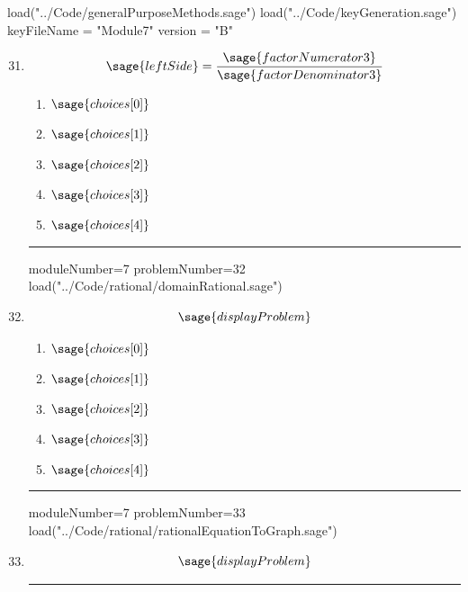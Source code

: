 \documentclass[14pt]{article}
\newcommand{\litem}[1]{\item#1\hspace*{-1cm}\rule{\textwidth}{0.4pt}}
\begin{document}
\pagestyle{fancy}

\begin{sagesilent}
load("../Code/generalPurposeMethods.sage")
load("../Code/keyGeneration.sage")
keyFileName = "Module7"
version = "B"
\end{sagesilent}

\begin{enumerate}
\setcounter{enumi}{30}


\begin{sagesilent}
moduleNumber=7
problemNumber=31
load("../Code/rational/solveRationalLinear.sage")
\end{sagesilent}

\litem{ 

	\[ \sage{leftSide} = \frac{\sage{factorNumerator3}}{\sage{factorDenominator3}}  \]

	\begin{enumerate}[label=\Alph*.]
    \item \( \sage{choices[0]} \)
    \item \( \sage{choices[1]} \)
    \item \( \sage{choices[2]} \)
    \item \( \sage{choices[3]} \)
    \item \( \sage{choices[4]} \)
	\end{enumerate}
}

\begin{sagesilent}
moduleNumber=7
problemNumber=32
load("../Code/rational/domainRational.sage")
\end{sagesilent}

\litem{ 

\[ \sage{displayProblem} \]

	\begin{enumerate}[label=\Alph*.]
		\item \( \sage{choices[0]} \)
		\item \( \sage{choices[1]} \)
		\item \( \sage{choices[2]} \)
		\item \( \sage{choices[3]} \)
		\item \( \sage{choices[4]} \)
	\end{enumerate}
}

\begin{sagesilent}
moduleNumber=7
problemNumber=33
load("../Code/rational/rationalEquationToGraph.sage")
\end{sagesilent}

\litem{ 
\[ \sage{displayProblem} \]

}
\end{enumerate}
\end{document}
